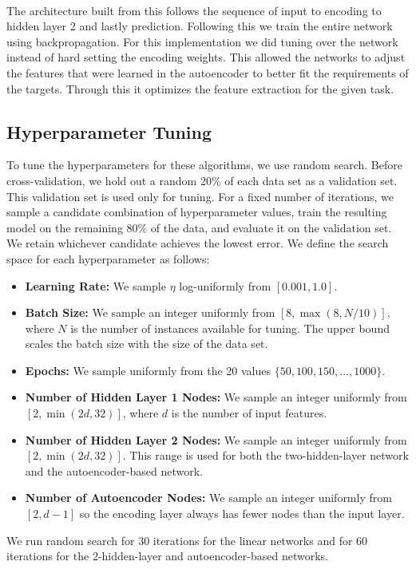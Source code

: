 \documentclass[twoside,11pt]{article}
\begin{document}
\paragraph{}
The architecture built from this follows the sequence of input to encoding to hidden layer 2 and lastly prediction. Following this we train the entire network using backpropagation. For this implementation we did tuning over the network instead of hard setting the encoding weights. This allowed the networks to adjust the features that were learned in the autoencoder to better fit the requirements of the targets. Through this it optimizes the feature extraction for the given task. 

\subsection{Hyperparameter Tuning}
\label{sec:tuning}
To tune the hyperparameters for these algorithms, we use random search. Before cross-validation, we hold out a random 20\% of each data set as a validation set. This validation set is used only for tuning. For a fixed number of iterations, we sample a candidate combination of hyperparameter values, train the resulting model on the remaining 80\% of the data, and evaluate it on the validation set. We retain whichever candidate achieves the lowest error. We define the search space for each hyperparameter as follows:
\begin{itemize}
    \item \textbf{Learning Rate:} We sample $\eta$ log-uniformly from $[0.001, 1.0]$.
    \item \textbf{Batch Size:} We sample an integer uniformly from $[8, \max(8, N/10)]$, where $N$ is the number of instances available for tuning. The upper bound scales the batch size with the size of the data set.
    \item \textbf{Epochs:} We sample uniformly from the 20 values $\{50, 100, 150, \dots, 1000\}$.
    \item \textbf{Number of Hidden Layer 1 Nodes:} We sample an integer uniformly from $[2, \min(2d, 32)]$, where $d$ is the number of input features.
    \item \textbf{Number of Hidden Layer 2 Nodes:} We sample an integer uniformly from $[2, \min(2d, 32)]$. This range is used for both the two-hidden-layer network and the autoencoder-based network.
    \item \textbf{Number of Autoencoder Nodes:} We sample an integer uniformly from $[2, d-1]$ so the encoding layer always has fewer nodes than the input layer.
\end{itemize}
We run random search for 30 iterations for the linear networks and for 60 iterations for the 2-hidden-layer and autoencoder-based networks.
\end{document}
